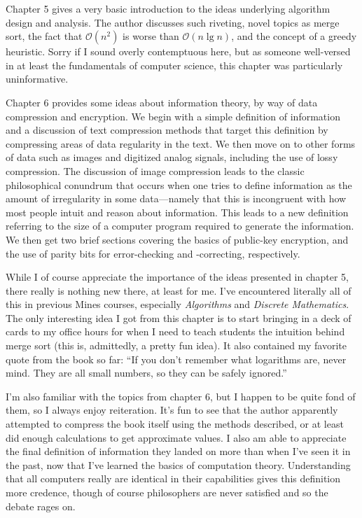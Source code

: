 \documentclass[12pt]{article}
\begin{document}

\pagestyle{fancy}
\fancyhead{} %


Chapter 5 gives a very basic introduction to the ideas underlying algorithm
design and analysis. The author discusses such riveting, novel topics as merge
sort, the fact that $\mathcal{O}\left(n^2\right)$ is worse than
$\mathcal{O}\left(n\lg{n}\right)$, and the concept of a greedy heuristic.
Sorry if I sound overly contemptuous here, but as someone well-versed in at
least the fundamentals of computer science, this chapter was particularly
uninformative.

Chapter 6 provides some ideas about information theory, by way of data
compression and encryption. We begin with a simple definition of information
and a discussion of text compression methods that target this definition by
compressing areas of data regularity in the text. We then move on to other
forms of data such as images and digitized analog signals, including the use of
lossy compression. The discussion of image compression leads to the classic
philosophical conundrum that occurs when one tries to define information as the
amount of irregularity in some data---namely that this is incongruent with how
most people intuit and reason about information. This leads to a new definition
referring to the size of a computer program required to generate the
information. We then get two brief sections covering the basics of public-key
encryption, and the use of parity bits for error-checking and -correcting,
respectively.

\vspace{1em}

While I of course appreciate the importance of the ideas presented in chapter
5, there really is nothing new there, at least for me. I've encountered
literally all of this in previous Mines courses, especially \textit{Algorithms}
and \textit{Discrete Mathematics}. The only interesting idea I got from this
chapter is to start bringing in a deck of cards to my office hours for when I
need to teach students the intuition behind merge sort (this is, admittedly, a
pretty fun idea). It also contained my favorite quote from the book so far:
``If you don't remember what logarithms are, never mind. They are all small
numbers, so they can be safely ignored.''

I'm also familiar with the topics from chapter 6, but I happen to be quite fond
of them, so I always enjoy reiteration. It's fun to see that the author
apparently attempted to compress the book itself using the methods described,
or at least did enough calculations to get approximate values. I also am able
to appreciate the final definition of information they landed on more than when
I've seen it in the past, now that I've learned the basics of computation
theory. Understanding that all computers really are identical in their
capabilities gives this definition more credence, though of course philosophers
are never satisfied and so the debate rages on.
\end{document}
